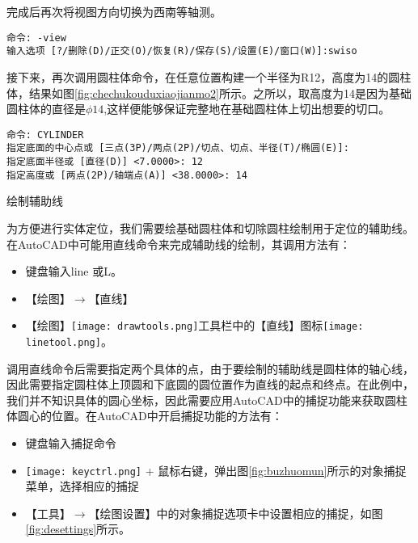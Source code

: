 \begin{procedure}
完成后再次将视图方向切换为西南等轴测。
\begin{lstlisting}
命令: -view 
输入选项 [?/删除(D)/正交(O)/恢复(R)/保存(S)/设置(E)/窗口(W)]:swiso 
\end{lstlisting}

接下来，再次调用圆柱体命令，在任意位置构建一个半径为R12，高度为14的圆柱体，结果如图\ref{fig:chechukouduxiaojianmo2}所示。之所以，取高度为14是因为基础圆柱体的直径是$\phi 14$,这样便能够保证完整地在基础圆柱体上切出想要的切口。
\begin{lstlisting}
命令: CYLINDER
指定底面的中心点或 [三点(3P)/两点(2P)/切点、切点、半径(T)/椭圆(E)]:
指定底面半径或 [直径(D)] <7.0000>: 12
指定高度或 [两点(2P)/轴端点(A)] <38.0000>: 14
\end{lstlisting}

\item 绘制辅助线

为方便进行实体定位，我们需要绘基础圆柱体和切除圆柱绘制用于定位的辅助线。在AutoCAD中可能用直线命令来完成辅助线的绘制，其调用方法有：

\begin{itemize}
\item 键盘输入line 或L。
\item 【绘图】$\rightarrow$【直线】
\item 【绘图】\texttt{[image: drawtools.png]}工具栏中的【直线】图标\texttt{[image: linetool.png]}。
\end{itemize}

调用直线命令后需要指定两个具体的点，由于要绘制的辅助线是圆柱体的轴心线，因此需要指定圆柱体上顶圆和下底圆的圆位置作为直线的起点和终点。在此例中，我们并不知识具体的圆心坐标，因此需要应用AutoCAD中的捕捉功能来获取圆柱体圆心的位置。在AutoCAD中开启捕捉功能的方法有：

\begin{itemize}
	\item 键盘输入捕捉命令
	\item \texttt{[image: keyctrl.png]} + 鼠标右键，弹出图\ref{fig:buzhuomun}所示的对象捕捉菜单，选择相应的捕捉
	\item 【工具】$\rightarrow$【绘图设置】中的对象捕捉选项卡中设置相应的捕捉，如图\ref{fig:desettings}所示。
\end{itemize}

\begin{figure}[htbp]%
\centering
\begin{floatrow}[2]
\end{floatrow}
\end{figure}


\end{procedure}
